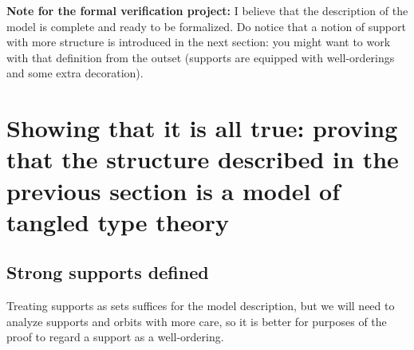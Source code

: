 \documentclass[112pt]{article}
\begin{document}

{\bf Note for the formal verification project:}  I believe that the description of the model is complete and ready to be formalized.  Do notice that a notion of support with more structure is introduced in the next section:  you might want to work with that definition from the outset (supports are equipped with well-orderings and some extra decoration).


\newpage

\section{Showing that it is all true:  proving that the structure described in the previous section is a model of tangled type theory}

\subsection{Strong supports defined}

Treating supports as sets suffices for the model description, but we will need to analyze supports and orbits with more care, so it is better for purposes
of the proof to regard a support as a well-ordering.
\end{document}
